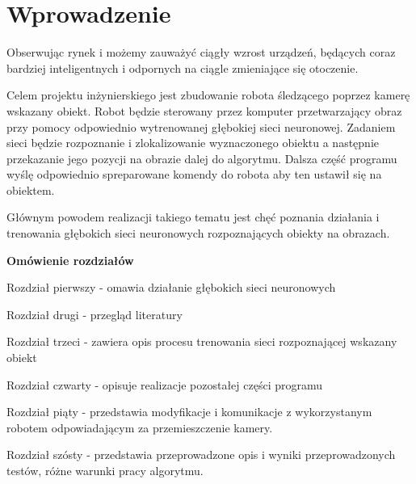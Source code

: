 \section{Wprowadzenie}

Obserwując rynek i możemy zauważyć ciągły wzrost urządzeń, będących coraz bardziej inteligentnych
i odpornych na ciągle zmieniające się otoczenie. 

Celem projektu inżynierskiego jest zbudowanie robota śledzącego poprzez kamerę wskazany obiekt.
Robot będzie sterowany przez komputer przetwarzający obraz przy pomocy odpowiednio wytrenowanej
głębokiej sieci neuronowej. Zadaniem sieci będzie rozpoznanie i zlokalizowanie wyznaczonego obiektu
a następnie przekazanie jego pozycji na obrazie dalej do algorytmu. Dalsza część programu
wyślę odpowiednio spreparowane komendy do robota aby ten ustawił się na obiektem.

Głównym powodem realizacji takiego tematu jest chęć poznania działania i trenowania głębokich sieci 
neuronowych rozpoznających obiekty na obrazach.

\textbf{Omówienie rozdziałów}


Rozdział pierwszy - omawia działanie głębokich sieci neuronowych


Rozdział drugi - przegląd literatury 


Rozdział trzeci - zawiera opis procesu trenowania sieci rozpoznającej wskazany obiekt


Rozdział czwarty - opisuje realizacje pozostałej części programu 

Rozdział piąty - przedstawia modyfikacje i komunikacje z wykorzystanym robotem 
odpowiadającym za przemieszczenie kamery. 

Rozdział szósty - przedstawia przeprowadzone opis i wyniki przeprowadzonych testów,
różne warunki pracy algorytmu.